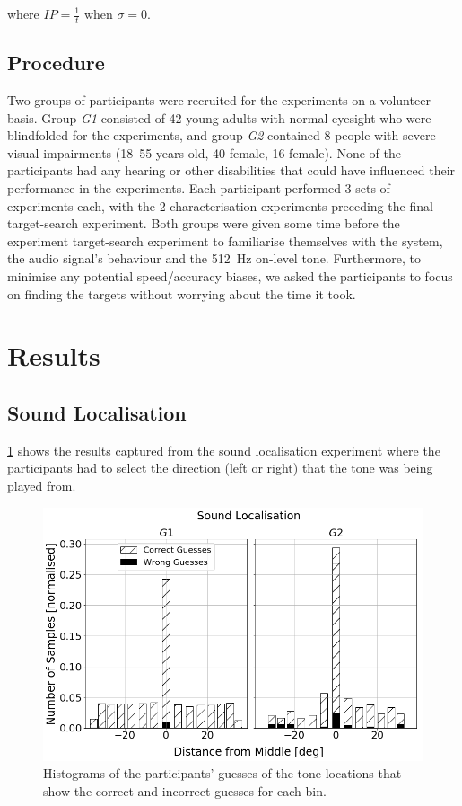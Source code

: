 \documentclass[]{interact}
\begin{document}
\noindent
where $IP = \frac{1}{t}$ when $\sigma=0$.

\subsection{Procedure}

Two groups of participants were recruited for the experiments on a volunteer basis. 
Group \textit{G1} consisted of 42 young adults with normal eyesight who were blindfolded for the experiments, and group \textit{G2} contained 8 people with severe visual impairments (18--55 years old, 40 female, 16 female). 
None of the participants had any hearing or other disabilities that could have influenced their performance in the experiments.
Each participant performed 3 sets of experiments each, with the 2 characterisation experiments preceding the final target-search experiment. 
Both groups were given some time before the experiment target-search experiment to familiarise themselves with the system, the audio signal's behaviour and the \SI{512}{\hertz} on-level tone. 
Furthermore, to minimise any potential speed/accuracy biases, we asked the participants to focus on finding the targets without worrying about the time it took. 

\section{Results}\label{sec:results}

\subsection{Sound Localisation}

\cref{fig:sound-localisation} shows the results captured from the sound localisation experiment where the participants had to select the direction (left or right) that the tone was being played from. 

\begin{figure}
  \centering
  \includegraphics[width=1.0\textwidth]{figures/sound_localisation.png}
  \caption{Histograms of the participants' guesses of the tone locations that show the correct and incorrect guesses for each bin. }\label{fig:sound-localisation}
\end{figure}
\end{document}
